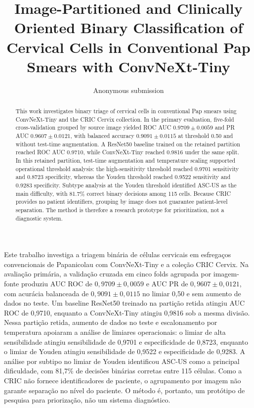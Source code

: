 \documentclass[12pt]{article}
\title{Image-Partitioned and Clinically Oriented Binary Classification of
Cervical Cells in Conventional Pap Smears with ConvNeXt-Tiny}
\author{Anonymous submission}
\begin{document}
\maketitle

\begin{abstract}
This work investigates binary triage of cervical cells in conventional Pap
smears using ConvNeXt-Tiny and the CRIC Cervix collection. In the primary
evaluation, five-fold cross-validation grouped by source image yielded ROC AUC
$0.9709\pm0.0059$ and PR AUC $0.9607\pm0.0121$, with balanced accuracy
$0.9091\pm0.0115$ at threshold 0.50 and without test-time augmentation. A
ResNet50 baseline trained on the retained partition reached ROC AUC 0.9710,
while ConvNeXt-Tiny reached 0.9816 under the same split. In this retained
partition, test-time augmentation and temperature scaling supported operational
threshold analysis: the high-sensitivity threshold reached 0.9701 sensitivity
and 0.8723 specificity, whereas the Youden threshold reached 0.9522 sensitivity
and 0.9283 specificity. Subtype analysis at the Youden threshold identified
ASC-US as the main difficulty, with 81.7\% correct binary decisions among 115
cells. Because CRIC provides no patient identifiers, grouping by image does not
guarantee patient-level separation. The method is therefore a research
prototype for prioritization, not a diagnostic system.
\end{abstract}

\begin{resumo}
Este trabalho investiga a triagem binária de células cervicais em esfregaços
convencionais de Papanicolau com ConvNeXt-Tiny e a coleção CRIC Cervix. Na
avaliação primária, a validação cruzada em cinco folds agrupada por
imagem-fonte produziu AUC ROC de $0{,}9709\pm0{,}0059$ e AUC PR de
$0{,}9607\pm0{,}0121$, com acurácia balanceada de $0{,}9091\pm0{,}0115$ no
limiar 0,50 e sem aumento de dados no teste. Um baseline ResNet50 treinado na
partição retida atingiu AUC ROC de 0,9710, enquanto a ConvNeXt-Tiny atingiu
0,9816 sob a mesma divisão. Nessa partição retida, aumento de dados no teste e
escalonamento por temperatura apoiaram a análise de limiares operacionais: o
limiar de alta sensibilidade atingiu sensibilidade de 0,9701 e especificidade
de 0,8723, enquanto o limiar de Youden atingiu sensibilidade de 0,9522 e
especificidade de 0,9283. A análise por subtipo no limiar de Youden
identificou ASC-US como a principal dificuldade, com 81,7\% de decisões
binárias corretas entre 115 células. Como a CRIC não fornece identificadores de
paciente, o agrupamento por imagem não garante separação no nível do paciente.
O método é, portanto, um protótipo de pesquisa para priorização, não um sistema
diagnóstico.
\end{resumo}










\end{document}
